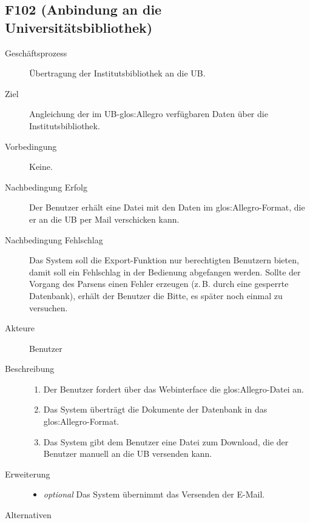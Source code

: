 \subsection{F102 (Anbindung an die Universitätsbibliothek)}
\begin{description}
  \item[Geschäftsprozess]Übertragung der Institutsbibliothek an die \gls{UB}.
  \item[Ziel]Angleichung der im \gls{UB}-\gls{glos:Allegro} verfügbaren Daten über die Institutsbibliothek.
  \item[Vorbedingung]Keine.
  \item[Nachbedingung Erfolg]Der Benutzer erhält eine Datei mit den Daten im \gls{glos:Allegro}-Format, die er an die \gls{UB} per Mail verschicken kann.
  \item[Nachbedingung Fehlschlag]Das System soll die Export-Funktion nur berechtigten Benutzern bieten, damit soll ein Fehlschlag in der Bedienung abgefangen werden. Sollte der Vorgang des Parsens einen Fehler erzeugen (z.\,B. durch eine gesperrte Datenbank), erhält der Benutzer die Bitte, es später noch einmal zu versuchen.
  \item[Akteure]Benutzer
  \item[Beschreibung]\hfill
    \begin{enumerate}
      \item Der Benutzer fordert über das Webinterface die \gls{glos:Allegro}-Datei an.
      \item Das System überträgt die Dokumente der Datenbank in das \gls{glos:Allegro}-Format.
      \item Das System gibt dem Benutzer eine Datei zum Download, die der Benutzer manuell an die \gls{UB} versenden kann.
    \end{enumerate}
  \item[Erweiterung]\hfill
    \begin{itemize}
      \item \emph{optional} Das System übernimmt das Versenden der E-Mail.
    \end{itemize}
  \item[Alternativen]
\end{description}

